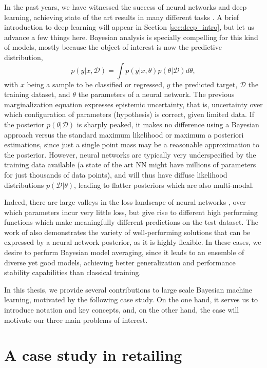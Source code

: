 In the past years, we have witnessed the success of neural networks and deep learning, achieving state of the art results in many different tasks \parencite{lecun2015deep}. A brief introduction to deep learning will appear in Section \ref{sec:deep_intro}, but let us advance a few things here. Bayesian analysis is specially compelling for this kind of models, mostly because the object of interest  is now the predictive distribution,
$$
p(y|x, \mathcal{D}) = \int p(y|x,\theta) p (\theta| \mathcal{D}) d\theta,
$$
with $x$ being a sample to be classified or regressed, $y$ the predicted target, $\mathcal{D}$ the training dataset, and $\theta$ the parameters of a neural network. The previous marginalization equation expresses epistemic uncertainty, that is, uncertainty over which configuration of parameters (hypothesis) is correct, given limited data. If the posterior $p(\theta| \mathcal{D})$ is sharply peaked, it makes no difference using a Bayesian approach versus the standard maximum likelihood or maximum a posteriori estimations, since just a single point mass may be a reasonable approximation to the posterior. However, neural networks are typically very underspecified by the training data available (a state of the art NN might have millions of parameters for just thousands of data points), and will thus have diffuse likelihood distributions $p(\mathcal{D}|\theta)$, leading to flatter posteriors which are also multi-modal.

Indeed, there are large valleys in the loss landscape of
neural networks \parencite{garipov2018loss}, over which parameters incur very little loss, but give rise to different high performing
functions which make meaningfully different predictions on the test dataset. The work of \parencite{ZOLNA2020102969}
also demonstrates the variety of well-performing solutions that can be expressed by a neural network
posterior, as it is highly flexible. In these cases, we desire to perform  Bayesian model averaging, since it leads to an ensemble of diverse yet good models, achieving better generalization  and performance stability capabilities than classical training.

In this thesis, we provide several contributions to large scale Bayesian machine learning, motivated by the following case study. On the one hand, it serves us to introduce notation and key concepts, and, on the other hand, the case will motivate our three main problems of interest.

\section{A case study in retailing}\label{sec:dlms}


